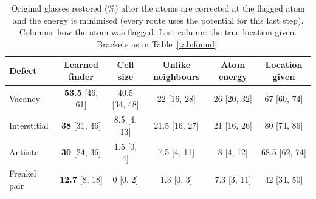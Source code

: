 \begin{table}[t]
\centering
\caption{Original glasses restored (\%) after the atoms are corrected at the flagged atom and the energy is minimised (every route uses the potential for this last step). Columns: how the atom was flagged. Last column: the true location given. Brackets as in Table~\ref{tab:found}.}
\label{tab:restored}
\footnotesize\setlength{\tabcolsep}{3.5pt}
\begin{tabular}{@{}lccccc@{}}
\toprule
Defect & Learned finder & Cell size & Unlike neighbours & Atom energy & Location given \\
\midrule
Vacancy & \textbf{53.5} {\scriptsize[46, 61]} & 40.5 {\scriptsize[34, 48]} & 22 {\scriptsize[16, 28]} & 26 {\scriptsize[20, 32]} & 67 {\scriptsize[60, 74]} \\
Interstitial & \textbf{38} {\scriptsize[31, 46]} & 8.5 {\scriptsize[4, 13]} & 21.5 {\scriptsize[16, 27]} & 21 {\scriptsize[16, 26]} & 80 {\scriptsize[74, 86]} \\
Antisite & \textbf{30} {\scriptsize[24, 36]} & 1.5 {\scriptsize[0, 4]} & 7.5 {\scriptsize[4, 11]} & 8 {\scriptsize[4, 12]} & 68.5 {\scriptsize[62, 74]} \\
Frenkel pair & \textbf{12.7} {\scriptsize[8, 18]} & 0 {\scriptsize[0, 2]} & 1.3 {\scriptsize[0, 3]} & 7.3 {\scriptsize[3, 11]} & 42 {\scriptsize[34, 50]} \\
\bottomrule
\end{tabular}
\end{table}
